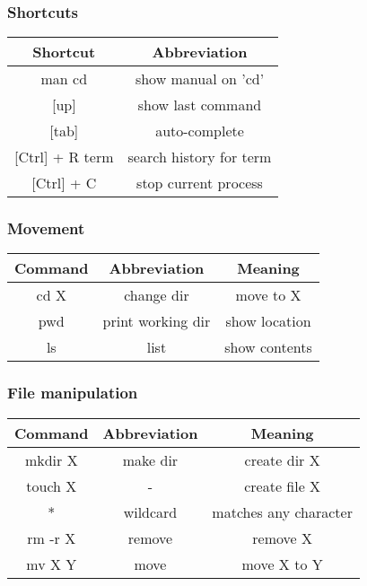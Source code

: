 \documentclass[]{beamer}
\newcommand\Fontlarge{\fontsize{12}{30.4}\selectfont}
\begin{document}
\begin{frame}
\frametitle{Shortcuts}

\Fontlarge

\begin{table}[h]
\begin{tabular}{cc}
\textbf{Shortcut}   & \textbf{Abbreviation}   \\ \hline
man cd & show manual on 'cd' \\ \hline
{[}up{]}            & show last command       \\ \hline
{[}tab{]}           & auto-complete           \\ \hline
{[}Ctrl{]} + R term & search history for term \\ \hline
{[}Ctrl{]} + C      & stop current process   
\end{tabular}
\end{table}

\end{frame}


\begin{frame}
\frametitle{Movement}

\Fontlarge

\begin{table}[h]
\begin{tabular}{ccc}

\textbf{Command} & \textbf{Abbreviation} & \textbf{Meaning} \\ \hline
cd X             & change dir            & move to X        \\ \hline
pwd              & print working dir     & show location    \\ \hline
ls               & list                  & show contents    \\ 
\end{tabular}
\end{table}

\end{frame}


\begin{frame}
\frametitle{File manipulation}

\Fontlarge

\begin{table}[h]
\begin{tabular}{ccc}
\textbf{Command} & \textbf{Abbreviation} & \textbf{Meaning} \\ \hline
mkdir X          & make dir              & create dir X     \\ \hline
touch X          & -                     & create file X    \\ \hline
*                & wildcard              & matches any character \\ \hline
rm -r X          & remove                & remove X         \\ \hline
mv X Y           & move                  & move X to Y     
\end{tabular}
\end{table}

\end{frame}
\end{document}
